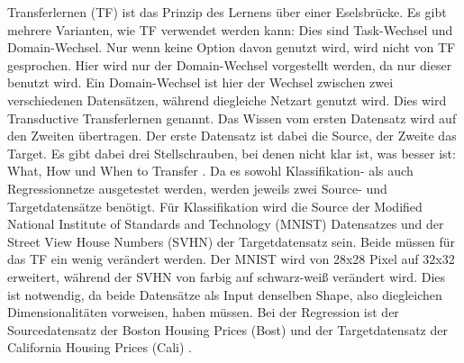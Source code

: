 Transferlernen (TF) ist das Prinzip des Lernens über einer Eselsbrücke. 
Es gibt mehrere Varianten, wie TF verwendet werden kann: Dies sind Task-Wechsel und Domain-Wechsel. 
Nur wenn keine Option davon genutzt wird, wird nicht von TF gesprochen. 
Hier wird nur der Domain-Wechsel vorgestellt werden, da nur dieser benutzt wird. Ein Domain-Wechsel ist hier der Wechsel 
zwischen zwei verschiedenen Datensätzen, während diegleiche Netzart genutzt wird. 
Dies wird Transductive Transferlernen\cite{survey_transfer} genannt. 
Das Wissen vom ersten Datensatz wird auf den Zweiten übertragen. Der erste Datensatz ist dabei die Source, der Zweite das Target. 
Es gibt dabei drei Stellschrauben, bei denen nicht klar ist, was besser ist: What, How und When to Transfer \cite{survey_transfer}. 
Da es sowohl Klassifikation- als auch Regressionnetze ausgetestet werden, werden jeweils zwei Source- und Targetdatensätze benötigt. 
Für Klassifikation wird die Source der Modified National Institute of Standards and Technology \cite{handwritten_digit} (MNIST) Datensatzes  
und der 
Street View House Numbers (SVHN) \cite{house_numbers} der Targetdatensatz sein. Beide müssen für das TF ein wenig 
verändert werden. Der MNIST wird von 28x28 Pixel auf 32x32 erweitert, während der SVHN von farbig auf schwarz-weiß verändert wird. 
Dies ist notwendig, da beide Datensätze als Input denselben Shape, also diegleichen Dimensionalitäten vorweisen, haben müssen. 
Bei der Regression ist der Sourcedatensatz der Boston Housing Prices (Bost) \cite{Boston_housing} und der Targetdatensatz der 
California Housing Prices (Cali) \cite{California_housing}. 

